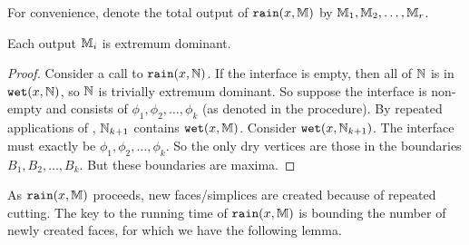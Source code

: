 %
%
\medskip
{}

\medskip
For convenience, denote the total output of ${\tt rain}(x,\mathbb{M})$ by $\mathbb{M}_1, \mathbb{M}_2, \ldots, \mathbb{M}_r$.

\begin{lemma} \label{lem:rain-1} Each output $\mathbb{M}_i$ is extremum dominant.
\end{lemma}

\begin{proof} Consider a call to ${\tt rain}(x,\mathbb{N})$. If the interface is empty, then all of $\mathbb{N}$
is in ${\tt wet}(x,\mathbb{N})$, so $\mathbb{N}$ is trivially extremum dominant. So suppose the interface
is non-empty and consists of $\phi_1, \phi_2, \ldots, \phi_k$ (as denoted in the procedure).
By repeated applications of , $\mathbb{N}_{k+1}$ contains ${\tt wet}(x,\mathbb{M})$. 
Consider ${\tt wet}(x,\mathbb{N}_{k+1})$. The interface must exactly be $\phi_1, \phi_2, \ldots, \phi_k$.
So the only dry vertices are those in the boundaries $B_1, B_2, \ldots, B_k$. But these
boundaries are maxima.
\end{proof}

As ${\tt rain}(x,\mathbb{M})$ proceeds, new faces/simplices are created because of repeated cutting. 
The key to the running time of ${\tt rain}(x,\mathbb{M})$ is bounding the number of newly created faces, for which we have the following lemma.

